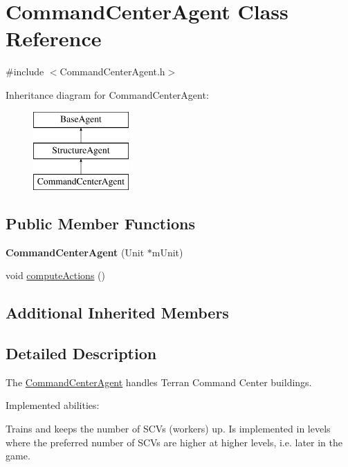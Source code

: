 \hypertarget{class_command_center_agent}{\section{Command\-Center\-Agent Class Reference}
\label{class_command_center_agent}
}


{\ttfamily \#include $<$Command\-Center\-Agent.\-h$>$}

Inheritance diagram for Command\-Center\-Agent\-:\begin{figure}[H]
\begin{center}
\leavevmode
\includegraphics[height=3.000000cm]{class_command_center_agent}
\end{center}
\end{figure}
\subsection*{Public Member Functions}
\begin{DoxyCompactItemize}
\item 
\hypertarget{class_command_center_agent_ad7366849184ff6c148721e0cbb58cb39}{{\bfseries Command\-Center\-Agent} (Unit $\ast$m\-Unit)}\label{class_command_center_agent_ad7366849184ff6c148721e0cbb58cb39}

\item 
void \hyperlink{class_command_center_agent_ab65d18822f93a222f8bce3c85836217d}{compute\-Actions} ()
\end{DoxyCompactItemize}
\subsection*{Additional Inherited Members}


\subsection{Detailed Description}
The \hyperlink{class_command_center_agent}{Command\-Center\-Agent} handles Terran Command Center buildings.

Implemented abilities\-:
\begin{DoxyItemize}
\item Trains and keeps the number of S\-C\-Vs (workers) up. Is implemented in levels where the preferred number of S\-C\-Vs are higher at higher levels, i.\-e. later in the game.
\end{DoxyItemize}

